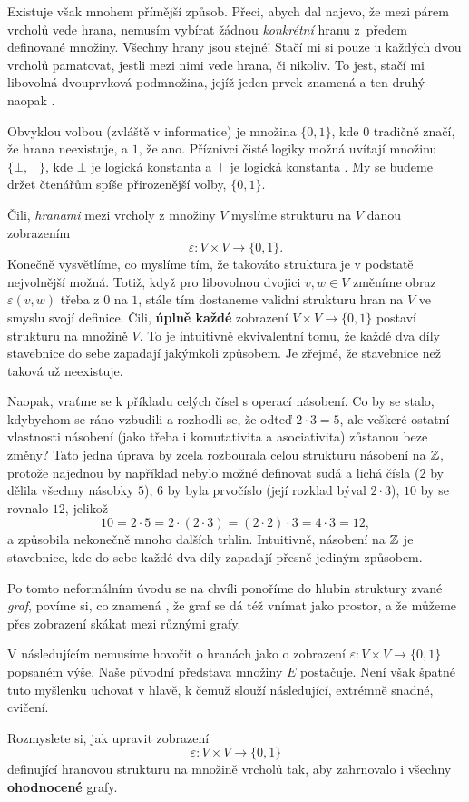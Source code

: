 Existuje však mnohem přímější způsob. Přeci, abych dal najevo, že mezi párem
vrcholů vede hrana, nemusím vybírat žádnou \emph{konkrétní} hranu z~předem
definované množiny. Všechny hrany jsou stejné! Stačí mi si pouze u každých dvou
vrcholů pamatovat, jestli mezi nimi vede hrana, či nikoliv. To jest, stačí mi
libovolná dvouprvková podmnožina, jejíž jeden prvek znamená  a ten druhý naopak .

Obvyklou volbou (zvláště v informatice) je množina $\{0,1\}$, kde $0$ tradičně
značí, že hrana neexistuje, a $1$, že ano. Příznivci čisté logiky možná uvítají
množinu $\{\bot,\top\}$, kde $\bot$ je logická konstanta  a $\top$ je
logická konstanta . My se budeme držet čtenářům spíše přirozenější
volby, $\{0,1\}$.

Čili, \emph{hranami} mezi vrcholy z množiny $V$ myslíme strukturu na $V$ danou
zobrazením
\[
 \varepsilon:V \times V \to \{0,1\}.
\]
Konečně vysvětlíme, co myslíme tím, že takováto struktura je v podstatě
nejvolnější možná. Totiž, když pro libovolnou dvojici $v,w \in V$ změníme obraz
$\varepsilon(v,w)$ třeba z $0$ na $1$, stále tím dostaneme validní strukturu
hran na $V$ ve smyslu svojí definice. Čili, \textbf{úplně každé} zobrazení $V
\times V \to \{0,1\}$ postaví strukturu na množině $V$. To je intuitivně
ekvivalentní tomu, že každé dva díly stavebnice do sebe zapadají jakýmkoli
způsobem. Je zřejmé, že  stavebnice než taková už neexistuje.

Naopak, vraťme se k příkladu celých čísel s operací násobení. Co by se stalo,
kdybychom se ráno vzbudili a rozhodli se, že odteď $2 \cdot 3 = 5$, ale veškeré
ostatní vlastnosti násobení (jako třeba i komutativita a asociativita) zůstanou
beze změny? Tato jedna úprava by zcela rozbourala celou strukturu násobení na
$\mathbb{Z}$, protože najednou by například nebylo možné definovat sudá a lichá čísla
($2$ by dělila všechny násobky $5$), $6$ by byla prvočíslo (její rozklad býval
$2 \cdot 3$), $10$ by se rovnalo $12$, jelikož
\[
 10 = 2 \cdot 5 = 2 \cdot (2 \cdot 3) = (2 \cdot 2) \cdot 3 = 4 \cdot 3 = 12,
\]
a způsobila nekonečně mnoho dalších trhlin. Intuitivně, násobení na $\mathbb{Z}$ je
stavebnice, kde do sebe každé dva díly zapadají přesně jediným způsobem.

Po tomto neformálním úvodu se na chvíli ponoříme do hlubin struktury zvané
\emph{graf}, povíme si, co znamená , že graf se dá též vnímat
jako prostor, a že můžeme přes zobrazení skákat mezi různými grafy.

V následujícím nemusíme hovořit o hranách jako o zobrazení $\varepsilon:V \times
V \to \{0,1\}$ popsaném výše. Naše původní představa množiny $E$ postačuje. Není
však špatné tuto myšlenku uchovat v hlavě, k čemuž slouží následující, extrémně
snadné, cvičení.

\begin{exercise}
 Rozmyslete si, jak upravit zobrazení
 \[
  \varepsilon:V \times V \to \{0,1\}
 \]
 definující hranovou strukturu na množině vrcholů tak, aby zahrnovalo i všechny
 \textbf{ohodnocené} grafy.
\end{exercise}



